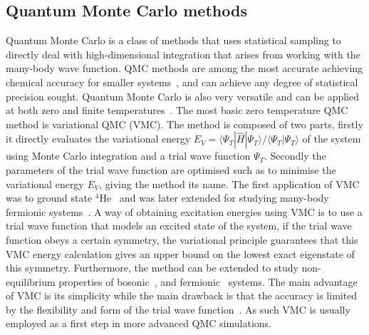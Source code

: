 \documentclass[final,3p,times,twocolumn]{elsarticle}
\begin{document}
	\subsection{Quantum Monte Carlo methods}
	\label{subsec:intro-QMC}
	Quantum Monte Carlo is a class of methods that uses statistical sampling to directly deal with high-dimensional integration that arises from working with the many-body wave function. QMC methods are among the most accurate achieving chemical accuracy for smaller systems~\cite{foulkes2001quantum}, and can achieve any degree of statistical precision sought. Quantum Monte Carlo is also very versatile and can be applied at both zero and finite temperatures~\cite{austin2012quantum}.	
	The most basic zero temperature QMC method is variational QMC (VMC). The method is composed of two parts, firstly it directly evaluates the variational energy $E_V = \langle \Psi_{T} | \hat H | \Psi_{T} \rangle / \langle \Psi_{T} | \Psi_{T} \rangle$ of the system using Monte Carlo integration and a trial wave function $\Psi_{T}$. Secondly the parameters of the trial wave function are optimised such as to minimise the variational energy $E_V$, giving the method its name. The first application of VMC was to ground state ${}^4$He~\cite{mcmillan1965ground} and was later extended for studying many-body fermionic systems~\cite{ceperley1977monte}. A way of obtaining excitation energies using VMC is to use a trial wave function that models an excited state of the system, if the trial wave function obeys a certain symmetry, the variational principle guarantees that this VMC energy calculation gives an upper bound on the lowest exact eigenstate of this symmetry. Furthermore, the method can be extended to study non-equilibrium properties of bosonic~\cite{carleo2012localization, carleo2014light}, and fermionic~\cite{ido2015time} systems. The main advantage of VMC is its simplicity while the main drawback is that the accuracy is limited by the flexibility and form of the trial wave function~\cite{austin2012quantum}. As such VMC is usually employed as a first step in more advanced QMC simulations. 
		
\end{document}
